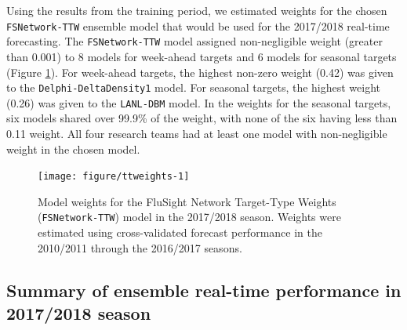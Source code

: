 \documentclass{article}\usepackage[]{graphicx}\usepackage[]{color}
\newenvironment{knitrout}{}{} %
\begin{document}
Using the results from the training period, we estimated weights for the chosen {\tt FSNetwork-TTW} ensemble model that would be used for the 2017/2018 real-time forecasting.
The {\tt FSNetwork-TTW} model assigned non-negligible weight (greater than 0.001) to 8 models for week-ahead targets and 6 models for seasonal targets (Figure \ref{fig:ttweights}).
For week-ahead targets, the highest non-zero weight 
(0.42) 
was given to the {\tt Delphi-DeltaDensity1} model.
For seasonal targets, the highest weight 
(0.26) 
was given to the {\tt LANL-DBM} model.
In the weights for the seasonal targets, six models shared over 99.9\% of the weight, with none of the six having less than 0.11 weight.
All four research teams had at least one model with non-negligible weight in the chosen model. 

\begin{knitrout}
\color{fgcolor}\begin{figure}
\texttt{[image: figure/ttweights-1]} \caption[Model weights for the FluSight Network Target-Type Weights ({\tt FSNetwork-TTW}) model in the 2017/2018 season]{Model weights for the FluSight Network Target-Type Weights ({\tt FSNetwork-TTW}) model in the 2017/2018 season. Weights were estimated using cross-validated forecast performance in the 2010/2011 through the 2016/2017 seasons.}\label{fig:ttweights}
\end{figure}


\end{knitrout}





\subsection{Summary of ensemble real-time performance in 2017/2018 season}
\end{document}
